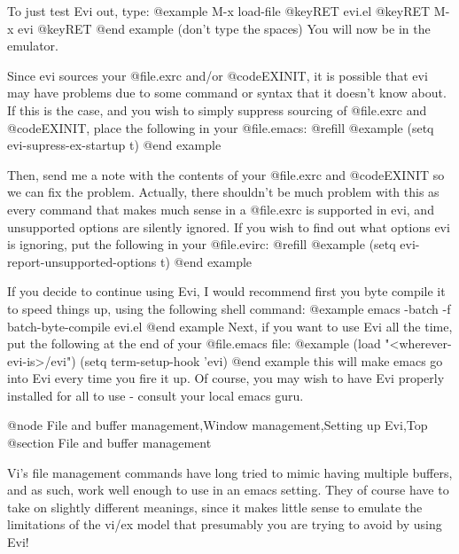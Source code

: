 To just test Evi out, type:
@example
M-x load-file @key{RET} evi.el @key{RET}
M-x evi @key{RET}
@end example
(don't type the spaces) You will now be in the emulator.

Since evi sources your @file{.exrc} and/or @code{EXINIT}, it is possible
that evi may have problems due to some command or syntax that it doesn't
know about.  If this is the case, and you wish to simply suppress sourcing
of @file{.exrc} and @code{EXINIT}, place the
following in your @file{.emacs}: @refill
@example
(setq evi-supress-ex-startup t)
@end example

Then, send me a note with the contents of your @file{.exrc} and @code{EXINIT}
so we can fix the problem.
Actually, there shouldn't be much problem with this as
every command that makes much sense in a @file{.exrc} is supported in evi,
and unsupported options are silently ignored.
If you wish to find out what options evi is ignoring, put the following
in your @file{.evirc}: @refill
@example
(setq evi-report-unsupported-options t)
@end example

If you decide to continue using Evi, I would recommend first you byte
compile it to speed things up, using the following shell command:
@example
emacs -batch -f batch-byte-compile evi.el
@end example
Next, if you want to use Evi all the time, put the following at the end
of your @file{.emacs} file:
@example
(load "<wherever-evi-is>/evi")
(setq term-setup-hook 'evi)
@end example
this will make emacs go into Evi every time you fire it up.  Of course,
you may wish to have Evi properly installed for all to use - consult
your local emacs guru.

@node File and buffer management,Window management,Setting up Evi,Top
@section File and buffer management

Vi's file management commands have long tried to mimic having multiple
buffers, and as such, work well enough to use in an emacs setting.  They
of course have to take on slightly different meanings, since it makes
little sense to emulate the limitations of the vi/ex model that
presumably you are trying to avoid by using Evi!

